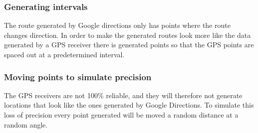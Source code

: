 \subsubsection{Generating intervals}
The route generated by Google directions only has points where the route changes direction.
In order to make the generated routes look more like the data generated by a GPS receiver there is generated points so that the GPS points are spaced out at a predetermined interval.

\subsubsection{Moving points to simulate precision}
The GPS receivers are not 100\% reliable, and they will therefore not generate locations that look like the ones generated by Google Directions.
To simulate this loss of precision every point generated will be moved a random distance at a random angle.